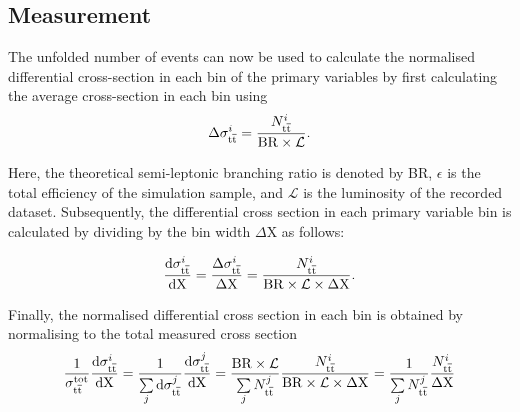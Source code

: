 
\subsection{Measurement}
\label{ss:measurement}

The unfolded number of \ttbar events can now be used to calculate the normalised differential cross-section in
each bin of the primary variables by first calculating the average cross-section in each bin using
\begin{equation}
\label{eq:finll_1}
\Delta\sigma_{\mathrm{t}\overline{\mathrm{t}}}^i = \frac{N_{\mathrm{t}\overline{\mathrm{t}}}^i}{\mathrm{BR} \times \mathcal{L}}. 
\end{equation}

Here, the theoretical \ttbar semi-leptonic branching ratio is denoted by BR, $\epsilon$ is the total
efficiency of the \ttbar simulation sample, and $\mathcal{L}$ is the luminosity of the recorded dataset.
Subsequently, the differential cross section in each primary variable bin is calculated by dividing by the bin
width $\Delta \mathrm{X}$ as follows:

\begin{equation}
\frac{\mathrm{d}\sigma_{\mathrm{t}\overline{\mathrm{t}}}^i}{\mathrm{d} \mathrm{X}} =
\frac{\Delta\sigma_{\mathrm{t}\overline{\mathrm{t}}}^i}{\Delta \mathrm{X} } = \frac{N_{\mathrm{t}\overline{\mathrm{t}}}^i}{\mathrm{BR} \times {\cal L} \times \Delta
\mathrm{X}} .
\end{equation}

Finally, the normalised differential cross section in each bin is obtained by normalising to the total
measured cross section
\begin{equation}
\label{eq:normalisedxs}
\frac{1}{\sigma_{\mathrm{t}\overline{\mathrm{t}}}^\mathrm{tot}} \frac{\mathrm{d}\sigma_{\mathrm{t}\overline{\mathrm{t}}}^i}{\mathrm{d} \mathrm{X}} =
\frac{1}{\sum\limits_{j}{\mathrm{d}\sigma_{\mathrm{t}\overline{\mathrm{t}}}^j}} \frac{\mathrm{d}\sigma_{\mathrm{t}\overline{\mathrm{t}}}^j}{\mathrm{d} \mathrm{X}} =
\frac{\mathrm{BR} \times {\cal L}}{\sum\limits_{j}{N_{\mathrm{t}\overline{\mathrm{t}}}^j}}\frac{N_{\mathrm{t}\overline{\mathrm{t}}}^i}{\mathrm{BR} \times {\cal L} \times \Delta
\mathrm{X}} = \frac{1}{\sum\limits_{j}{N_{\mathrm{t}\overline{\mathrm{t}}}^j}}\frac{N_{\mathrm{t}\overline{\mathrm{t}}}^i}{\Delta\mathrm{X}}
\end{equation}
		